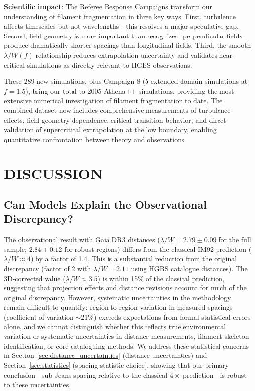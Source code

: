 \documentclass[twoside,twocolumn]{mnras}
\begin{document}
\textbf{Scientific impact}: The Referee Response Campaigns transform our understanding of filament fragmentation in three key ways. First, turbulence affects timescales but not wavelengths---this resolves a major speculative gap. Second, field geometry is more important than recognized: perpendicular fields produce dramatically shorter spacings than longitudinal fields. Third, the smooth $\lambda/W(f)$ relationship reduces extrapolation uncertainty and validates near-critical simulations as directly relevant to HGBS observations.

These 289 new simulations, plus Campaign 8 (5 extended-domain simulations at $f = 1.5$), bring our total to 2005 Athena++ simulations, providing the most extensive numerical investigation of filament fragmentation to date. The combined dataset now includes comprehensive measurements of turbulence effects, field geometry dependence, critical transition behavior, and direct validation of supercritical extrapolation at the low boundary, enabling quantitative confrontation between theory and observations.

\section{DISCUSSION}

\subsection{Can Models Explain the Observational Discrepancy?}

The observational result with Gaia DR3 distances ($\lambda/W = 2.79 \pm 0.09$ for the full sample; $2.84 \pm 0.12$ for robust regions) differs from the classical IM92 prediction ($\lambda/W \approx 4$) by a factor of 1.4. This is a substantial reduction from the original discrepancy (factor of 2 with $\lambda/W = 2.11$ using HGBS catalogue distances). The 3D-corrected value ($\lambda/W \approx 3.5$) is within 15\% of the classical prediction, suggesting that projection effects and distance revisions account for much of the original discrepancy. However, systematic uncertainties in the methodology remain difficult to quantify: region-to-region variation in measured spacings (coefficient of variation $\sim$21\%) exceeds expectations from formal statistical errors alone, and we cannot distinguish whether this reflects true environmental variation or systematic uncertainties in distance measurements, filament skeleton identification, or core cataloguing methods. We address these statistical concerns in Section~\ref{sec:distance_uncertainties} (distance uncertainties) and Section~\ref{sec:statistics} (spacing statistic choice), showing that our primary conclusion—sub-Jeans spacing relative to the classical $4\times$ prediction—is robust to these uncertainties.
\end{document}
